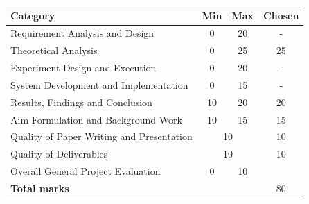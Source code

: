 \documentclass[paper.tex]{subfiles}
\begin{document}
\renewcommand{\arraystretch}{1.25}
\begin{tabular}{|l|c|c|c|}
  \hline
  \textbf{Category} & \textbf{Min} & \textbf{Max} & \textbf{Chosen} \\ \hline \hline
  Requirement Analysis and Design & 0 & 20 &
    - \\ \hline
  Theoretical Analysis & 0 & 25 &
    25 \\ \hline
  Experiment Design and Execution & 0 & 20 &
    - \\ \hline
  System Development and Implementation & 0 & 15 &
    - \\ \hline
  Results, Findings and Conclusion & 10 & 20 &
    20 \\ \hline
  Aim Formulation and Background Work & 10 & 15 &
    15 \\ \hline
  Quality of Paper Writing and Presentation & \multicolumn{2}{c|}{10} &
    10 \\ \hline
  Quality of Deliverables & \multicolumn{2}{c|}{10} &
    10 \\ \hline
  Overall General Project Evaluation & 0 & 10 &
    \\ \hline
  \hline
  \multicolumn{3}{|l|}{\textbf{Total marks}} & 80 \\ \hline
\end{tabular}

\endgroup
\thispagestyle{empty}
\newpage
\setcounter{page}{1}
\end{document}
